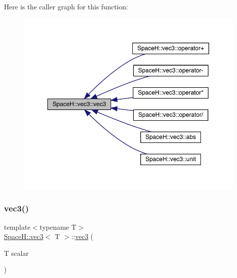 Here is the caller graph for this function\+:
\nopagebreak
\begin{figure}[H]
\begin{center}
\leavevmode
\includegraphics[width=348pt]{struct_space_h_1_1vec3_adaeadb1aa964e9f603d2d2402bc0e29a_icgraph}
\end{center}
\end{figure}
\mbox{\label{struct_space_h_1_1vec3_a642fe9876e4a929a13b859e0941a5a77}} 
\subsubsection{\texorpdfstring{vec3()}{vec3()}\hspace{0.1cm}{\footnotesize\ttfamily [2/14]}}
{\footnotesize\ttfamily template$<$typename T$>$ \\
\mbox{\hyperlink{struct_space_h_1_1vec3}{Space\+H\+::vec3}}$<$ T $>$\+::\mbox{\hyperlink{struct_space_h_1_1vec3}{vec3}} (\begin{DoxyParamCaption}\item[{T}]{scalar }\end{DoxyParamCaption})\hspace{0.3cm}{\ttfamily [inline]}}

\mbox{\label{struct_space_h_1_1vec3_ac718d5c1fa131b4a3dafbf8fe709a73a}} 
